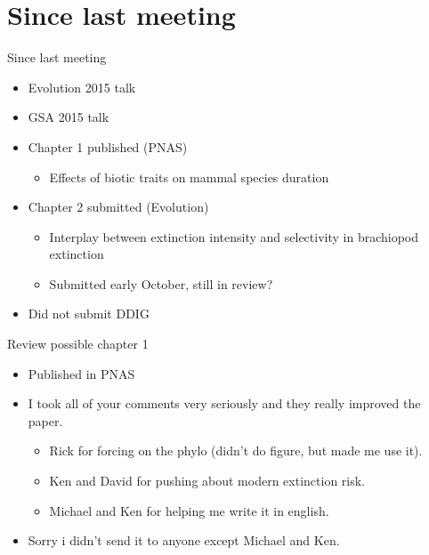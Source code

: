 \documentclass{beamer}
\title{}
\author{Peter D Smits}
\institute{Committee on Evolutionary Biology, University of Chicago}
\date{}
\begin{document}
\begin{frame}
  \tableofcontents
\end{frame}

\section{Since last meeting}
\begin{frame}
  \begin{block}{Since last meeting}
    \begin{itemize}
      \item Evolution 2015 talk
      \item GSA 2015 talk
      \item Chapter 1 published (PNAS)
        \begin{itemize}
          \item Effects of biotic traits on mammal species duration
        \end{itemize}
      \item Chapter 2 submitted (Evolution)
        \begin{itemize}
          \item Interplay between extinction intensity and selectivity in brachiopod extinction
          \item Submitted early October, still in review?
        \end{itemize}
      \item Did not submit DDIG
    \end{itemize}
  \end{block}
\end{frame}


\begin{frame}
  \begin{block}{Review possible chapter 1}
    \begin{itemize}
      \item Published in PNAS
      \item I took all of your comments very seriously and they really improved the paper.
        \begin{itemize}
          \item Rick for forcing on the phylo (didn't do figure, but made me use it).
          \item Ken and David for pushing about modern extinction risk.
          \item Michael and Ken for helping me write it in english.
        \end{itemize}
      \item Sorry i didn't send it to anyone except Michael and Ken.
    \end{itemize}
  \end{block}
\end{frame}
\end{document}
